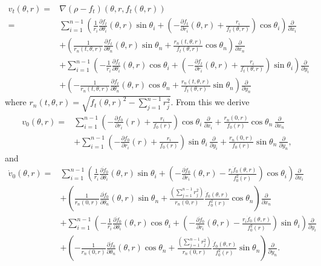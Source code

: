 \documentclass[12pt]{amsart}
\theoremstyle{definition}
\begin{document}
\begin{align*}
    v_t(\theta,r) =& \nabla(\rho-f_t)(\theta,r,f_t(\theta,r))\\ =&\sum_{i=1}^{n-1}\left(\frac{1}{r_i}\frac{\partial f_t}{\partial \theta_i}(\theta,r)\sin \theta_i + \left(-\frac{\partial f_t}{\partial r_i}(\theta,r) + \frac{r_i}{f_t(\theta,r)}
    \right)\cos \theta_i \right)\frac{\partial}{\partial x_i} \\&+ \left(\frac{1}{r_n(t,\theta,r)}\frac{\partial f_t}{\partial \theta_n}(\theta,r)\sin \theta_n  +  \frac{r_n(t,\theta,r)}{f_t(\theta,r)}\cos \theta_n \right)\frac{\partial}{\partial x_n}  \\&+ \sum_{i=1}^{n-1}\left(-\frac{1}{r_i}\frac{\partial f_t}{\partial \theta_i}(\theta,r)\cos \theta_i + \left(-\frac{\partial f_t}{\partial r_i}(\theta,r) + \frac{r_i}{f_t(\theta,r)}
    \right)\sin \theta_i \right) \frac{\partial}{\partial y_i} \\&+ \left(-\frac{1}{r_n(t,\theta,r)}\frac{\partial f_t}{\partial \theta_n}(\theta,r)\cos \theta_n  + \frac{r_n(t,\theta,r)}{f_t(\theta,r)}  \sin \theta_n \right)\frac{\partial}{\partial y_n}
\end{align*}
where $r_n(t,\theta,r) = \sqrt{f_t(\theta,r)^2 - \sum_{j=1}^{n-1}r_j^2}$. From this we derive
\begin{align*}
    v_0(\theta,r) =&\sum_{i=1}^{n-1} \left(-\frac{\partial f_0}{\partial r_i}(r) + \frac{r_i}{f_0(r)}
    \right)\cos \theta_i \,\frac{\partial}{\partial x_i} +   \frac{r_n(0,r)}{f_0(r)}\cos \theta_n \,\frac{\partial}{\partial x_n}  \\&+ \sum_{i=1}^{n-1} \left(-\frac{\partial f_0}{\partial r_i}(r) + \frac{r_i}{f_0(r)}
    \right)\sin \theta_i \, \frac{\partial}{\partial y_i} + \frac{r_n(0,r)}{f_0(r)}\sin \theta_n \,\frac{\partial}{\partial y_n},
\end{align*}
and
\begin{align*}
    \dot{v}_0(\theta,r) =& \sum_{i=1}^{n-1}\left(\frac{1}{r_i}\frac{\partial \dot{f}_0}{\partial \theta_i}(\theta,r)\sin \theta_i + \left(-\frac{\partial \dot{f}_0}{\partial r_i}(\theta,r) - \frac{r_i \dot{f}_0(\theta,r)}{f^2_0(r)}
    \right)\cos \theta_i \right)\frac{\partial}{\partial x_i} \\&+ \left(\frac{1}{r_n(0,r)}\frac{\partial \dot{f}_0}{\partial \theta_n}(\theta,r)\sin \theta_n  +  \frac{(\sum_{j=1}^{n-1}r_j^2)}{r_n(0,r)}\frac{\dot{f}_0(\theta,r)}{f^2_0(r)}\cos \theta_n \right)\frac{\partial}{\partial x_n}  \\&+ \sum_{i=1}^{n-1}\left(-\frac{1}{r_i}\frac{\partial \dot{f}_0}{\partial \theta_i}(\theta,r)\cos \theta_i + \left(-\frac{\partial \dot{f}_0}{\partial r_i}(\theta,r) - \frac{r_i \dot{f}_0(\theta,r)}{f^2_0(r)}
    \right)\sin \theta_i \right)\frac{\partial}{\partial y_i} \\&+  \left(-\frac{1}{r_n(0,r)}\frac{\partial \dot{f}_0}{\partial \theta_n}(\theta,r)\cos \theta_n  +  \frac{(\sum_{j=1}^{n-1}r_j^2)}{r_n(0,r)}\frac{\dot{f}_0(\theta,r)}{f^2_0(r)}\sin \theta_n \right)\frac{\partial}{\partial y_n}.
\end{align*}
\end{document}
